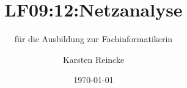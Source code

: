 \documentclass[]{beamer}
\title{LF09:12:Netzanalyse}
\subtitle{für die Ausbildung zur Fachinformatikerin}
\institute[GS-LDK]{Gewerbliche Schulen Dillenburg}
\author{Karsten Reincke}
\date{\today}
\def\cfgGl{../../../cfg.gl/}
\begin{document}

\begin{frame}
  \titlepage

  
\end{frame}






\logo{}
\newpage



%
\end{document}
